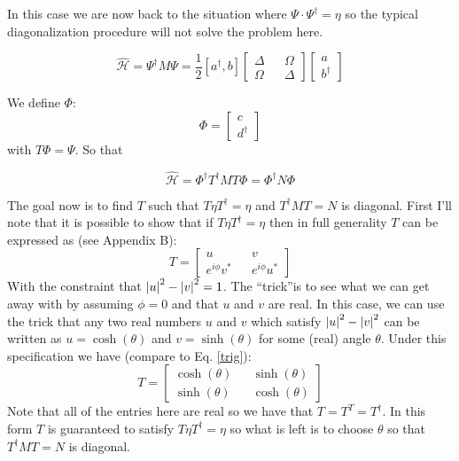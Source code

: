 \documentclass[12pt]{article}
\begin{document}
In this case we are now back to the situation where $\Psi \cdot \Psi^{\dag} = \eta$ so the typical diagonalization procedure will not solve the problem here.


\begin{equation}
\hat{\mathcal{H}} = \Psi^{\dagger} M \Psi = \frac{1}{2}[a^{\dagger}, b] 
\begin{bmatrix}
\Delta && \Omega\\
\Omega && \Delta
\end{bmatrix}
\begin{bmatrix}
a\\b^{\dagger}
\end{bmatrix}
\end{equation}


We define $\Phi$:
\begin{equation}
\Phi = \begin{bmatrix}
c\\d^{\dagger}
\end{bmatrix} 
\end{equation}
with $T \Phi = \Psi$. So that 

\begin{equation}
\hat{\mathcal{H}} = \Phi^{\dagger} T^{\dag}MT \Phi = \Phi^{\dag}N \Phi
\end{equation}


The goal now is to find $T$ such that $T \eta T^{\dagger} = \eta$ and $T^{\dagger}MT=N$ is diagonal. First I'll note that it is possible to show that if $T\eta T^{\dag} = \eta$ then in full generality $T$ can be expressed as (see Appendix B):
\begin{equation}
\label{nonunit}
T=\begin{bmatrix}
u && v\\
e^{i \phi} v^* && e^{i \phi} u^*
\end{bmatrix}
\end{equation}
With the constraint that $\abs{u}^2 - \abs{v}^2 =1$. The ``trick''is to see what we can get away with by assuming $\phi = 0$ and that $u$ and $v$ are real. In this case, we can use the trick that any two real numbers $u$ and $v$ which satisfy $\abs{u}^2 - \abs{v}^2$ can be written as $u = \cosh(\theta)$ and $v = \sinh(\theta)$ for some (real) angle $\theta$. Under this specification we have (compare to Eq. \ref{trig}):
\begin{equation}
\label{sinheq}
T = \begin{bmatrix}
\cosh(\theta) && \sinh(\theta)\\
\sinh(\theta) && \cosh(\theta)
\end{bmatrix}
\end{equation}
Note that all of the entries here are real so we have that $T = T^T = T^{\dag}$.
In this form $T$ is guaranteed to satisfy $T \eta T^{\dag} = \eta$ so what is left is to choose $\theta$ so that $T^{\dagger}MT=N$ is diagonal. 
\end{document}

